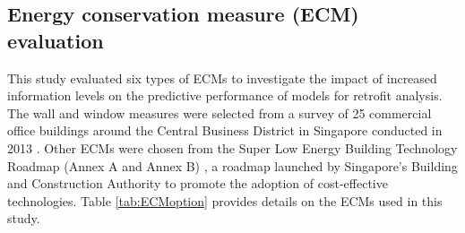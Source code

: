 \documentclass[3p,times,12pt]{elsarticle}
\begin{document}
\begin{sloppypar}
\begin{table}[H]
\centering
\normalsize
\caption{Inputs of envelope parameters for six levels of models}
\label{tab:buidling_info}
\end{table}

\subsection{Energy conservation measure (ECM) evaluation}
\label{S:2.4}
This study evaluated six types of ECMs to investigate the impact of increased information levels on the predictive performance of models for retrofit analysis. The wall and window measures were selected from a survey of 25 commercial office buildings around the Central Business District in Singapore conducted in 2013 \cite{adrian2013predicting}. Other ECMs were chosen from the Super Low Energy Building Technology Roadmap (Annex A and Annex B) \cite{bca2018super}, a roadmap launched by Singapore's Building and Construction Authority to promote the adoption of cost-effective technologies. Table \ref{tab:ECMoption} provides details on the ECMs used in this study.


\end{sloppypar}
\end{document}
